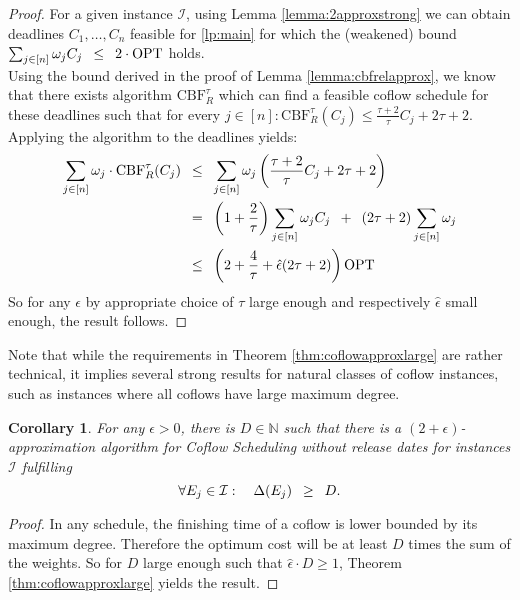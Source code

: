 \documentclass[11pt]{article}
\newcommand{\Hquad}{\hspace{0.5em}}
\newtheorem{corollary}[theorem]{Corollary}
\begin{document}
\rsthmcoflowapproxlarge*

\begin{proof}
For a given instance $\mathcal{I}$, using Lemma \ref{lemma:2approxstrong} we can obtain deadlines $C_1,\dotsc,C_n$ feasible for \ref{lp:main} for which the (weakened) bound $\sum_{j \in [n]}\omega_j C_j \Hquad \le \Hquad 2 \cdot \mathrm{OPT}$ holds.\\
Using the bound derived in the proof of Lemma \ref{lemma:cbfrelapprox}, we know that there exists algorithm $\mathrm{CBF}_R^\tau$ which can find a feasible coflow schedule for these deadlines such that for every $j \in [n]: \mathrm{CBF}_R^\tau(C_j) \le \tfrac{\tau+2}{\tau}C_j + 2\tau + 2$. Applying the algorithm to the deadlines yields:
\begin{align*}
\sum_{j \in [n]}\omega_j \cdot\mathrm{CBF}^\tau_R(C_j) &\Hquad\le\Hquad \sum_{j \in [n]}\omega_j \left( \frac{\tau+2}{\tau}C_j + 2\tau + 2 \right)\\
~&\Hquad=\Hquad \left(1 + \frac{2}{\tau}\right)\sum_{j \in [n]}\omega_j C_j \Hquad + \Hquad (2\tau + 2) \sum_{j \in [n]}\omega_j\\
~&\Hquad\le\Hquad \left(2 + \frac{4}{\tau} + \hat{\epsilon}(2\tau+2)\right) \mathrm{OPT}
\end{align*}
So for any $\epsilon$ by appropriate choice of $\tau$ large enough and respectively $\hat{\epsilon}$ small enough, the result follows.
\end{proof}

Note that while the requirements in Theorem \ref{thm:coflowapproxlarge} are rather technical, it implies several strong results for natural classes of coflow instances, such as instances where all coflows have large maximum degree.

\begin{corollary}
For any $\epsilon > 0$, there is $D \in \mathbb{N}$ such that there is a $(2+\epsilon)$-approximation algorithm for Coflow Scheduling without release dates for instances $\mathcal{I}$ fulfilling
\begin{equation*}
    \forall E_j \in \mathcal{I}:\quad \Delta(E_j) \Hquad\ge\Hquad D.
\end{equation*}
\end{corollary}
\begin{proof}
In any schedule, the finishing time of a coflow is lower bounded by its maximum degree. Therefore the optimum cost will be at least $D$ times the sum of the weights. So for $D$ large enough such that $\hat{\epsilon} \cdot D \ge 1$, Theorem \ref{thm:coflowapproxlarge} yields the result.
\end{proof}
\end{document}
